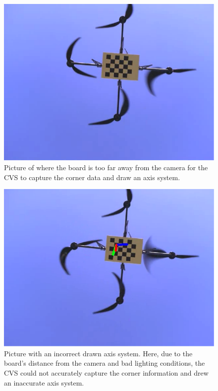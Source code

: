 \begin{figure}
  \centering
  \includegraphics[width=\textwidth]{figures/appendices/oov4}
  \caption{Picture of where the board is too far away from the camera for the CVS to capture the corner data and draw an axis system.}
\end{figure}

\begin{figure}
  \centering
  \includegraphics[width=\textwidth]{figures/appendices/oov7}
  \caption{Picture with an incorrect drawn axis system. Here, due to the board's distance from the camera and bad lighting conditions, the CVS could not accurately capture the corner information and drew an inaccurate axis system.}
\end{figure}

\endinput
